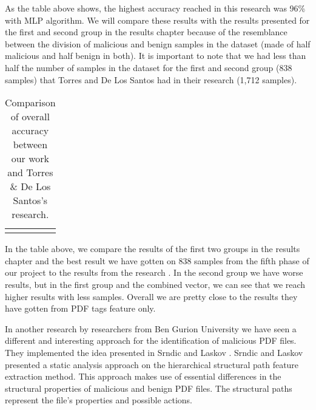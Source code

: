 \documentclass{article}
\begin{document}
\indent As the table above shows, the highest accuracy reached in this research was 96\% with MLP algorithm. We will compare these results with the results presented for the first and second group in the results chapter because of the resemblance between the division of malicious and benign samples in the dataset (made of half malicious and half benign in both). It is important to note that we had less than half the number of samples in the dataset for the first and second group (838 samples) that Torres and De Los Santos had in their research (1,712 samples).

\clearpage
\newpage

\begin{table}[htb]
\centering
\begin{tabular}{|l|M{2.0cm}|M{2.0cm}|M{2.0cm}|M{2.0cm}|}
	\hline
	&  &  &  & \tabularnewline
	\hline
	 &  &  &  & \tabularnewline
	\hline
\end{tabular}
\caption{Comparison of overall accuracy between our work and Torres \& De Los Santos’s research.}
\end{table}

\indent In the table above, we compare the results of the first two groups in the results chapter and the best result we have gotten on 838 samples from the fifth phase of our project to the results from the research \cite{torres2018malicious}. In the second group we have worse results, but in the first group and the combined vector, we can see that we reach higher results with less samples. Overall we are pretty close to the results they have gotten from PDF tags feature only.

\indent In another research by researchers from Ben Gurion University \cite{BGU2014malicious} we have seen a different and interesting approach for the identification of malicious PDF files. They implemented the idea presented in Srndic and Laskov \cite{Srndic2013Laskov}. Srndic and Laskov presented a static analysis approach on the hierarchical structural path feature extraction method. This approach makes use of essential differences in the structural properties of malicious and benign PDF files. The structural paths represent the file’s properties and possible actions.
\end{document}
